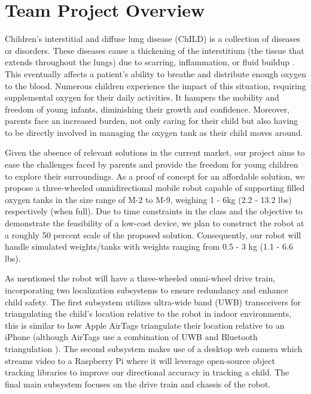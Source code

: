 \documentclass{report}
\begin{document}
    \section{Team Project Overview}
    Children's interstitial and diffuse lung disease (ChILD) is a collection of diseases or disorders. These diseases cause a thickening of the interstitium (the tissue that extends throughout the lungs) due to scarring, inflammation, or fluid buildup \cite{ChILD-2022}. This eventually affects a patient’s ability to breathe and distribute enough oxygen to the blood. Numerous children experience the impact of this situation, requiring supplemental oxygen for their daily activities. It hampers the mobility and freedom of young infants, diminishing their growth and confidence. Moreover, parents face an increased burden, not only caring for their child but also having to be directly involved in managing the oxygen tank as their child moves around.

    Given the absence of relevant solutions in the current market, our project aims to ease the challenges faced by parents and provide the freedom for young children to explore their surroundings. As a proof of concept for an affordable solution, we propose a three-wheeled omnidirectional mobile robot capable of supporting filled oxygen tanks in the size range of M-2 to M-9, weighing 1 - 6kg (2.2 - 13.2 lbs) respectively (when full). Due to time constraints in the class and the objective to demonstrate the feasibility of a low-cost device, we plan to construct the robot at a roughly 50 percent scale of the proposed solution. Consequently, our robot will handle simulated weights/tanks with weights ranging from 0.5 - 3 kg (1.1 - 6.6 lbs).
    
    As mentioned the robot will have a three-wheeled omni-wheel drive train, incorporating two localization subsystems to ensure redundancy and enhance child safety. The first subsystem utilizes ultra-wide band (UWB) transceivers for triangulating the child's location relative to the robot in indoor environments, this is similar to how Apple AirTags triangulate their location relative to an iPhone \cite{airtag_uwb} (although AirTags use a combination of UWB and Bluetooth triangulation \cite{airtag_ble}). The second subsystem makes use of a desktop web camera which streams video to a Raspberry Pi where it will leverage open-source object tracking libraries to improve our directional accuracy in tracking a child. The final main subsystem focuses on the drive train and chassis of the robot.
    
\end{document}
